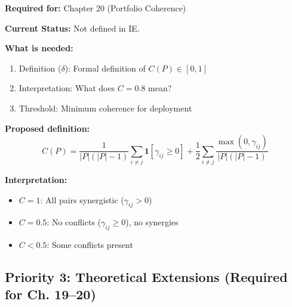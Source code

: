 \begin{tcolorbox}[colback=yellow!5!white, colframe=yellow!75!black,
    title=\textbf{TODO-IE-6: Coherence Score Definition $C(P)$}]

\textbf{Required for:} Chapter 20 (Portfolio Coherence)

\textbf{Current Status:} Not defined in IE.

\textbf{What is needed:}
\begin{enumerate}[nosep]
    \item Definition ($\delta$): Formal definition of $C(P) \in [0,1]$
    \item Interpretation: What does $C = 0.8$ mean?
    \item Threshold: Minimum coherence for deployment
\end{enumerate}

\textbf{Proposed definition:}
\[
C(P) = \frac{1}{|P|(|P|-1)} \sum_{i \neq j} \mathbf{1}[\gamma_{ij} \geq 0] + \frac{1}{2} \sum_{i \neq j} \frac{\max(0, \gamma_{ij})}{|P|(|P|-1)}
\]

\textbf{Interpretation:}
\begin{itemize}[nosep]
    \item $C = 1$: All pairs synergistic ($\gamma_{ij} > 0$)
    \item $C = 0.5$: No conflicts ($\gamma_{ij} \geq 0$), no synergies
    \item $C < 0.5$: Some conflicts present
\end{itemize}

\end{tcolorbox}

\subsection{Priority 3: Theoretical Extensions (Required for Ch. 19--20)}

